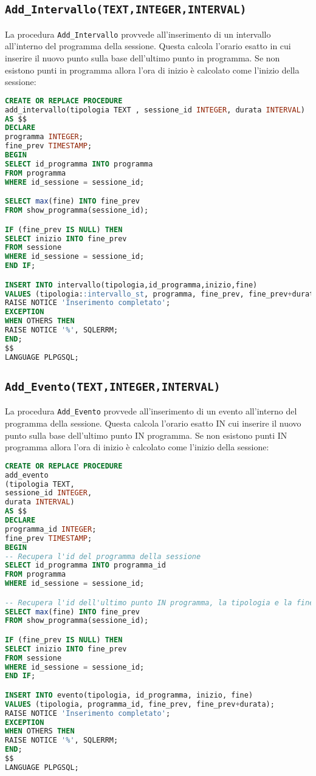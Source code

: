 \subsection{\texttt{Add\_Intervallo(TEXT,INTEGER,INTERVAL)}}
La procedura \texttt{Add\_Intervallo} provvede all'inserimento di un intervallo all'interno del programma della sessione. Questa calcola l'orario esatto in cui inserire il nuovo punto sulla base dell'ultimo punto in programma. Se non esistono punti in programma allora l'ora di inizio è calcolato come l'inizio della sessione:
\begin{lstlisting}[language=SQL,style=mystyle]
CREATE OR REPLACE PROCEDURE 
add_intervallo(tipologia TEXT , sessione_id INTEGER, durata INTERVAL)
AS $$
DECLARE
programma INTEGER;
fine_prev TIMESTAMP;
BEGIN
SELECT id_programma INTO programma
FROM programma
WHERE id_sessione = sessione_id;

SELECT max(fine) INTO fine_prev
FROM show_programma(sessione_id);

IF (fine_prev IS NULL) THEN
SELECT inizio INTO fine_prev
FROM sessione
WHERE id_sessione = sessione_id;
END IF;

INSERT INTO intervallo(tipologia,id_programma,inizio,fine)
VALUES (tipologia::intervallo_st, programma, fine_prev, fine_prev+durata);
RAISE NOTICE 'Inserimento completato';
EXCEPTION
WHEN OTHERS THEN
RAISE NOTICE '%', SQLERRM;
END;
$$ 
LANGUAGE PLPGSQL;
\end{lstlisting}
\subsection{\texttt{Add\_Evento(TEXT,INTEGER,INTERVAL)}}
La procedura \texttt{Add\_Evento} provvede all'inserimento di un evento all'interno del programma della sessione. Questa calcola l'orario esatto IN cui inserire il nuovo punto sulla base dell'ultimo punto IN programma. Se non esistono punti IN programma allora l'ora di inizio è calcolato come l'inizio della sessione:
\begin{lstlisting}[language=SQL,style=mystyle]
CREATE OR REPLACE PROCEDURE 
add_evento
(tipologia TEXT, 
sessione_id INTEGER, 
durata INTERVAL)
AS $$
DECLARE
programma_id INTEGER;
fine_prev TIMESTAMP;
BEGIN
-- Recupera l'id del programma della sessione
SELECT id_programma INTO programma_id
FROM programma
WHERE id_sessione = sessione_id;

-- Recupera l'id dell'ultimo punto IN programma, la tipologia e la fine
SELECT max(fine) INTO fine_prev
FROM show_programma(sessione_id);

IF (fine_prev IS NULL) THEN
SELECT inizio INTO fine_prev
FROM sessione
WHERE id_sessione = sessione_id;
END IF;

INSERT INTO evento(tipologia, id_programma, inizio, fine)
VALUES (tipologia, programma_id, fine_prev, fine_prev+durata);
RAISE NOTICE 'Inserimento completato';
EXCEPTION
WHEN OTHERS THEN
RAISE NOTICE '%', SQLERRM;
END;
$$
LANGUAGE PLPGSQL;
\end{lstlisting}
